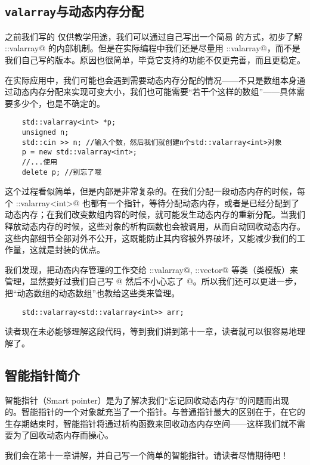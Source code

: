 \subsection*{\texttt{valarray}与动态内存分配}
之前我们写的 \lstinline@valarri@ 仅供教学用途，我们可以通过自己写出一个简易 \lstinline@valarri@ 的方式，初步了解 \lstinline@std::valarray@ 的内部机制。但是在实际编程中我们还是尽量用 \lstinline@std::valarray@，而不是我们自己写的版本。原因也很简单，毕竟它支持的功能不仅更完善，而且更稳定。\par
在实际应用中，我们可能也会遇到需要动态内存分配的情况——不只是数组本身通过动态内存分配来实现可变大小，我们也可能需要``若干个这样的数组''——具体需要多少个，也是不确定的。
\begin{lstlisting}
    std::valarray<int> *p;
    unsigned n;
    std::cin >> n; //输入个数，然后我们就创建n个std::valarray<int>对象
    p = new std::valarray<int>;
    //...使用
    delete p; //别忘了哦
\end{lstlisting}
这个过程看似简单，但是内部是非常复杂的。在我们分配一段动态内存的时候，每个 \lstinline@std::valarray<int>@ 也都有一个指针，等待分配动态内存，或者是已经分配到了动态内存；在我们改变数组内容的时候，就可能发生动态内存的重新分配。当我们释放动态内存的时候，这些对象的析构函数也会被调用，从而自动回收动态内存。这些内部细节全部对外不公开，这既能防止其内容被外界破坏，又能减少我们的工作量，这就是封装的优点。\par
我们发现，把动态内存管理的工作交给 \lstinline@std::valarray@, \lstinline@std::vector@ 等类（类模版）来管理，显然要好过我们自己写 \lstinline@new[]@ 然后不小心忘了 \lstinline@delete[]@。所以我们还可以更进一步，把``动态数组的动态数组''也教给这些类来管理。
\begin{lstlisting}
    std::valarray<std::valarray<int>> arr;
\end{lstlisting}
读者现在未必能够理解这段代码，等到我们讲到第十一章，读者就可以很容易地理解了。\par
\subsection*{智能指针简介}
智能指针（Smart pointer）是为了解决我们``忘记回收动态内存''的问题而出现的。智能指针的一个对象就充当了一个指针。与普通指针最大的区别在于，在它的生存期结束时，智能指针将通过析构函数来回收动态内存空间——这样我们就不需要为了回收动态内存而操心。\par
我们会在第十一章讲解，并自己写一个简单的智能指针。请读者尽情期待吧！\par
